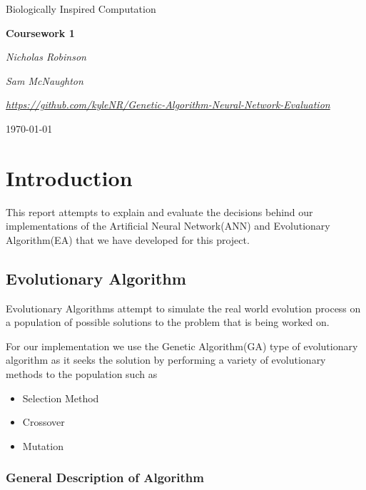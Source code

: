 \documentclass[12pt]{article}
\begin{document}

\begin{titlepage}
	\centering
	\vspace*{4cm}
	{\Large Biologically Inspired Computation \par}
	\vspace{2cm}
	{\huge\bfseries Coursework 1 \par}
	\vspace{2cm}
	{\Large\itshape Nicholas Robinson \par}
	{\Large\itshape Sam McNaughton \par}
	\vspace{2cm}
	{\Large\itshape\url{https://github.com/kyleNR/Genetic-Algorithm-Neural-Network-Evaluation} \par}
	\vfill
	{\large \today\par}
	\vspace{1cm}
\end{titlepage}

	\newpage
\section{Introduction}

This report attempts to explain and evaluate the decisions behind our implementations of the Artificial Neural Network(ANN) and Evolutionary Algorithm(EA) that we have developed for this project.

\subsection{Evolutionary Algorithm}

Evolutionary Algorithms attempt to simulate the real world evolution process on a population of possible solutions to the problem that is being worked on.

For our implementation we use the Genetic Algorithm(GA) type of evolutionary algorithm as it seeks the solution by performing a variety of evolutionary methods to the population such as 

\begin{itemize}

\item Selection Method
\item Crossover
\item Mutation

\end{itemize}


\subsubsection{General Description of Algorithm}
\end{document}
